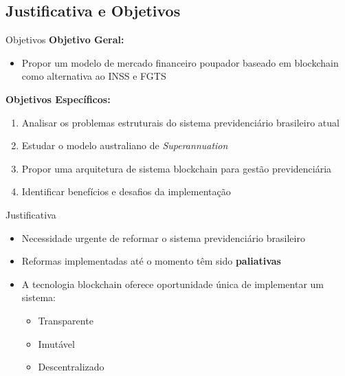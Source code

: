 \documentclass{libs/ufc_format}
\begin{document}
\subsection{Justificativa e Objetivos}
\begin{frame}{Objetivos}
    \textbf{Objetivo Geral:}
    \begin{itemize}
        \item Propor um modelo de mercado financeiro poupador baseado em blockchain como alternativa ao INSS e FGTS
    \end{itemize}
    
    \vspace{0.3cm}
    
    \textbf{Objetivos Específicos:}
    \begin{enumerate}
        \item Analisar os problemas estruturais do sistema previdenciário brasileiro atual
        \item Estudar o modelo australiano de \textit{Superannuation}
        \item Propor uma arquitetura de sistema blockchain para gestão previdenciária
        \item Identificar benefícios e desafios da implementação
    \end{enumerate}
\end{frame}

\begin{frame}{Justificativa}
    \begin{itemize}
        \item Necessidade urgente de reformar o sistema previdenciário brasileiro
        \item Reformas implementadas até o momento têm sido \textbf{paliativas}
        \item A tecnologia blockchain oferece oportunidade única de implementar um sistema:
        \begin{itemize}
            \item Transparente
            \item Imutável
            \item Descentralizado
        \end{itemize}
    \end{itemize}
    
    \vspace{0.3cm}
    
\end{frame}
\end{document}
